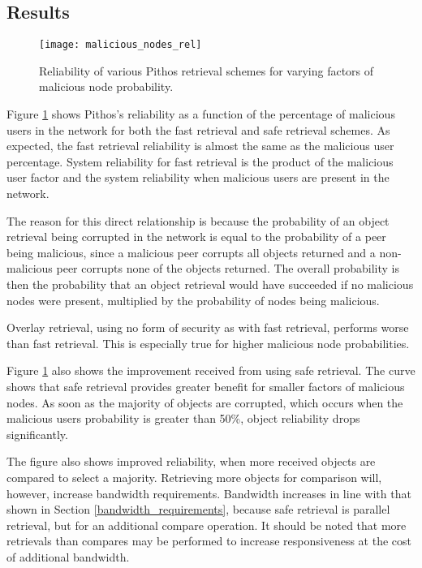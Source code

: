 \subsection{Results}
\begin{figure}[htbp]
 \centering
 \texttt{[image: malicious\_nodes\_rel]}
 \caption{Reliability of various Pithos retrieval schemes for varying factors of malicious node probability.}
 \label{fig_malicious_nodes_rel}
\end{figure}
%
Figure \ref{fig_malicious_nodes_rel} shows Pithos's reliability as a function of the percentage of malicious users in the network for both the fast retrieval and safe retrieval schemes. As expected, the fast retrieval reliability is almost the same as the malicious user percentage. System reliability for fast retrieval is the product of the malicious user factor and the system reliability when malicious users are present in the network.

The reason for this direct relationship is because the probability of an object retrieval being corrupted in the network is equal to the probability of a peer being malicious, since a malicious peer corrupts all objects returned and a non-malicious peer corrupts none of the objects returned. The overall probability is then the probability that an object retrieval would have succeeded if no malicious nodes were present, multiplied by the probability of nodes being malicious.

Overlay retrieval, using no form of security as with fast retrieval, performs worse than fast retrieval. This is especially true for higher malicious node probabilities.

Figure \ref{fig_malicious_nodes_rel} also shows the improvement received from using safe retrieval. The curve shows that safe retrieval provides greater benefit for smaller factors of malicious nodes. As soon as the majority of objects are corrupted, which occurs when the malicious users probability is greater than 50\%, object reliability drops significantly.

The figure also shows improved reliability, when more received objects are compared to select a majority. Retrieving more objects for comparison will, however, increase bandwidth requirements. Bandwidth increases in line with that shown in Section \ref{bandwidth_requirements}, because safe retrieval is parallel retrieval, but for an additional compare operation. It should be noted that more retrievals than compares may be performed to increase responsiveness at the cost of additional bandwidth.

